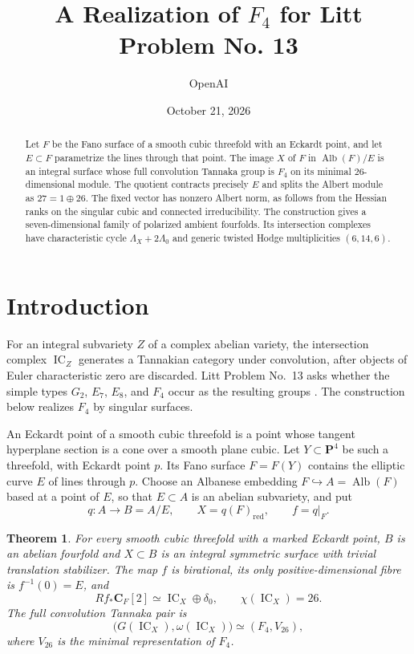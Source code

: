 \documentclass[10pt]{amsart}
\title[A realization of $F_4$ for Litt Problem No. 13]
{A Realization of $F_4$ for Litt Problem No. 13}
\author{OpenAI}
\date{October 21, 2026}
\numberwithin{equation}{section}
\newtheorem{theorem}{Theorem}[section]
\theoremstyle{remark}
\newcommand{\CC}{\mathbf C}
\newcommand{\PP}{\mathbf P}
\newcommand{\IC}{\operatorname{IC}}
\newcommand{\Alb}{\operatorname{Alb}}
\begin{document}
\raggedbottom
\begin{abstract}
Let $F$ be the Fano surface of a smooth cubic threefold with an Eckardt
point, and let $E\subset F$ parametrize the lines through that point.
The image $X$ of $F$ in $\Alb(F)/E$ is an integral surface whose full
convolution Tannaka group is $F_4$ on its minimal $26$-dimensional module.
The quotient contracts precisely $E$ and splits the Albert module as
$27=1\oplus26$.  The fixed vector has nonzero Albert norm, as follows
from the Hessian ranks on the singular cubic and connected irreducibility.
The construction gives a seven-dimensional family of polarized ambient
fourfolds.  Its intersection complexes have characteristic cycle
$\Lambda_X+2\Lambda_0$ and generic twisted Hodge multiplicities $(6,14,6)$.
\end{abstract}
\maketitle

\section{Introduction}

For an integral subvariety $Z$ of a complex abelian variety, the
intersection complex $\IC_Z$ generates a Tannakian category under
convolution, after objects of Euler characteristic zero are discarded.
Litt Problem No.~13 asks whether the simple types $G_2$, $E_7$, $E_8$,
and $F_4$ occur as the resulting groups \cite{Litt13}.  The construction
below realizes $F_4$ by singular surfaces.

An Eckardt point of a smooth cubic threefold is a point whose tangent
hyperplane section is a cone over a smooth plane cubic.  Let $Y\subset\PP^4$
be such a threefold, with Eckardt point $p$.  Its Fano surface $F=F(Y)$
contains the elliptic curve $E$ of lines through $p$.  Choose an Albanese
embedding $F\hookrightarrow A=\Alb(F)$ based at a point of $E$, so that
$E\subset A$ is an abelian subvariety, and put
\[
 q:A\longrightarrow B=A/E,\qquad X=q(F)_{\mathrm{red}},\qquad f=q|_F.
\]

\begin{theorem}\label{thm:main}
For every smooth cubic threefold with a marked Eckardt point, $B$ is an
abelian fourfold and $X\subset B$ is an integral symmetric surface with
trivial translation stabilizer.  The map $f$ is birational, its only
positive-dimensional fibre is $f^{-1}(0)=E$, and
\[
 Rf_*\CC_F[2]\simeq\IC_X\oplus\delta_0,\qquad \chi(\IC_X)=26.
\]
The full convolution Tannaka pair is
\[
 \bigl(G(\IC_X),\omega(\IC_X)\bigr)\simeq(F_4,V_{26}),
\]
where $V_{26}$ is the minimal representation of $F_4$.
\end{theorem}
\end{document}
